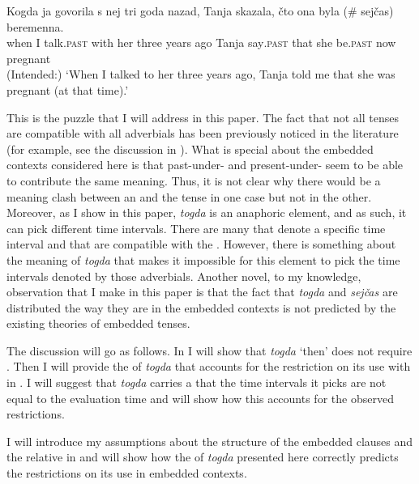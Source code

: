 \documentclass[output=paper,modfonts,newtxmath,hidelinks]{langscibook}
\begin{document}
\ea \label{20:ex6}
\gll Kogda ja govorila s nej tri goda nazad, Tanja skazala, čto ona byla (\#\hspace{-2pt} sejčas)     beremenna.\\
     when I talk\textsc{.past} with her three years ago Tanja say\textsc{.past} that she be.\textsc{past} {} now pregnant\\
\glt (Intended:) `When I talked to her three years ago, Tanja told me that she was pregnant (at that time).'
\z

\noindent This is the  puzzle that I will address in this paper. The fact that not all tenses are compatible with all adverbials has been previously noticed in the literature (for example, see the discussion in \citealt{Hornstein1990}). What is special about the embedded contexts considered here is that past-under- and present-under- seem to be able to contribute the same meaning. Thus, it is not clear why there would be a meaning clash between an  and the tense in one case but not in the other. Moreover, as I show in this paper, \textit{togda} is an anaphoric element, and as such, it can pick different time intervals. There are many  that denote a specific time interval and that are compatible with the . However, there is something about the meaning of \textit{togda} that makes it impossible for this element to pick the time intervals denoted by those adverbials. Another novel, to my knowledge, observation that I make in this paper is that the fact that \textit{togda} and \textit{sejčas} are distributed the way they are in the embedded contexts is not predicted by the existing theories of embedded tenses.

The discussion will go as follows. In  I will show that \textit{togda} ‘then’ does not require . Then I will provide the  of \textit{togda} that accounts for the restriction on its use with  in . I will suggest that \textit{togda} carries a  that the time intervals it picks are not equal to the evaluation time and will show how this  accounts for the observed restrictions.

I will introduce my assumptions about the structure of the embedded clauses and the relative  in  and will show how the  of \textit{togda} presented here correctly predicts the restrictions on its use in embedded contexts.
\end{document}

